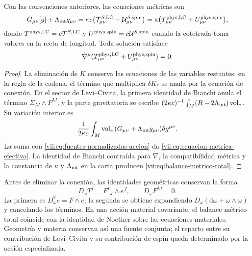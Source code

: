 \begin{proposition}
\label{vii:prop:fuente-metrica-balance}
Con las convenciones anteriores, las ecuaciones métricas son
\begin{equation}
 G_{\mu\nu}[g]+\Lambda_{\rm int}g_{\mu\nu}
 =\kappa c\bigl(\mathcal T^{S,\rm LC}_{\mu\nu}
                    +\mathcal U^{S,\rm spin}_{\mu\nu}\bigr)
 =\kappa\bigl(T^{\rm phys,LC}_{\mu\nu}
                    +U^{\rm phys,spin}_{\mu\nu}\bigr),
 \label{vii:eq:ecuacion-metrica-efectiva}
\end{equation}
donde \(T^{\rm phys,LC}=c\mathcal T^{S,\rm LC}\) y
\(U^{\rm phys,spin}=c\mathcal U^{S,\rm spin}\) cuando la
cotetrada toma valores en la recta de longitud. Toda solución satisface
\begin{equation}
 \mathring\nabla^\mu
   (T^{\rm phys,LC}_{\mu\nu}+U^{\rm phys,spin}_{\mu\nu})=0.
 \label{vii:eq:balance-metrico-total}
\end{equation}
\end{proposition}
\begin{proof}
La eliminación de \(K\) conserva las ecuaciones de las variables
restantes: en la regla de la cadena, el término que multiplica
\(\delta K_*\) se anula por la ecuación de conexión. En el sector
de Levi--Civita, la primera identidad de Bianchi anula el término
\(\Sigma_{IJ}\wedge F^{IJ}\), y la parte gravitatoria se escribe
\((2\kappa c)^{-1}\int_M(R-2\Lambda_{\rm int})\operatorname{vol}_e\).
Su variación interior es
\[
 \frac1{2\kappa c}\int_M\operatorname{vol}_e\,
        (G_{\mu\nu}+\Lambda_{\rm int}g_{\mu\nu})\delta g^{\mu\nu}.
\]
La suma con \eqref{vii:eq:fuentes-normalizadas-accion} da
\eqref{vii:eq:ecuacion-metrica-efectiva}. La identidad de Bianchi
contraída para \(\mathring\nabla\), la compatibilidad métrica y
la constancia de \(\kappa\) y \(\Lambda_{\rm int}\) en la carta
producen \eqref{vii:eq:balance-metrico-total}.
\end{proof}

Antes de eliminar la conexión, las identidades geométricas conservan
la forma
\begin{equation}
 D_\omega T^I=F^I{}_{J}\wedge e^J,\qquad D_\omega F^{IJ}=0.
 \label{vii:eq:bianchi-cartan}
\end{equation}
La primera es \(D_\omega^2e=F\wedge e\); la segunda se obtiene
expandiendo \(D_\omega(\mathrm d\omega+\omega\wedge\omega)\)
y cancelando los términos. En una acción material covariante, el
balance métrico total coincide con la identidad de Noether sobre las
ecuaciones materiales. Geometría y materia conservan así una fuente
conjunta; el reparto entre su contribución de Levi--Civita y su
contribución de espín queda determinado por la acción especializada.
